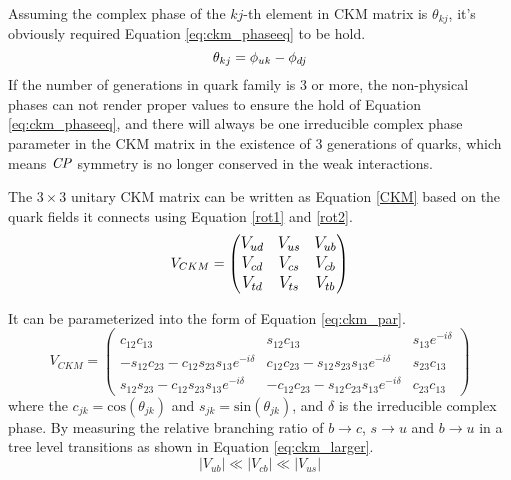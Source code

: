 Assuming the complex phase of the $kj$-th element in CKM matrix is $\theta_{kj}$, it's obviously required Equation \ref{eq:ckm_phaseeq} to be hold.
\begin{equation}\label{eq:ckm_phaseeq}
\large
\theta_{kj} = \phi_{uk}-\phi_{dj}
\end{equation}
If the number of generations in quark family is 3 or more, the non-physical phases can not render proper values to ensure the hold of Equation \ref{eq:ckm_phaseeq}, and there will always be one irreducible complex phase parameter in the CKM matrix in the existence of 3 generations of quarks, which means $\it{CP}$ symmetry is no longer conserved in the weak interactions. 

The $3\times 3$ unitary CKM matrix can be written as Equation \ref{CKM} based on the quark fields it connects using Equation \ref{rot1} and \ref{rot2}.
\begin{equation}\label{CKM}
\large
V_{CKM}=
\begin{pmatrix}
V_{ud} & V_{us} & V_{ub}\\
V_{cd} & V_{cs} & V_{cb}\\
V_{td} & V_{ts} & V_{tb}\\
\end{pmatrix}
\end{equation}

It can be parameterized into the form of Equation \ref{eq:ckm_par}.
\begin{equation}\label{eq:ckm_par}
V_{CKM}=
\begin{pmatrix}
c_{12}c_{13} & s_{12}c_{13} & s_{13}e^{-i\delta }\\
-s_{12}c_{23}-c_{12}s_{23}s_{13}e^{-i\delta } &c_{12}c_{23}-s_{12}s_{23}s_{13}e^{-i\delta } & s_{23}c_{13}\\
s_{12}s_{23}-c_{12}s_{23}s_{13}e^{-i\delta }  & -c_{12}c_{23}-s_{12}c_{23}s_{13}e^{-i\delta } & c_{23}c_{13}
\end{pmatrix}
\end{equation}
where the $c_{jk}=\text{cos}(\theta_{jk})$ and $s_{jk}=\text{sin}(\theta_{jk})$, and $\delta$ is the irreducible complex phase. By measuring the relative branching ratio of $b\to c$, $s\to u$ and $b\to u$ in a tree level transitions as shown in Equation \ref{eq:ckm_larger}.
\begin{equation}\label{eq:ckm_larger}
|V_{ub}|\ll |V_{cb}|\ll |V_{us}|
\end{equation}

